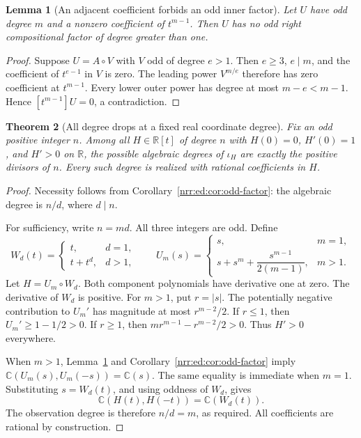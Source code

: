 \documentclass[11pt,letterpaper]{article}
\newtheorem{theorem}{Theorem}[section]
\newtheorem{lemma}[theorem]{Lemma}
\theoremstyle{definition}
\theoremstyle{remark}
\newcommand{\R}{\mathbb R}
\newcommand{\C}{\mathbb C}
\begin{document}
\begin{lemma}[An adjacent coefficient forbids an odd inner factor]
\label{nrr:ed:lem:adjacent}
Let $U$ have odd degree $m$ and a nonzero coefficient of $t^{m-1}$. Then $U$
has no odd right compositional factor of degree greater than one.
\end{lemma}

\begin{proof}
Suppose $U=A\circ V$ with $V$ odd of degree $e>1$. Then $e\ge3$, $e\mid m$,
and the coefficient of $t^{e-1}$ in $V$ is zero. The leading power
$V^{m/e}$ therefore has zero coefficient at $t^{m-1}$. Every lower outer power
has degree at most $m-e<m-1$. Hence $[t^{m-1}]U=0$, a contradiction.
\end{proof}

\begin{theorem}[All degree drops at a fixed real coordinate degree]
\label{nrr:ed:thm:divisors}
Fix an odd positive integer $n$. Among all $H\in\R[t]$ of degree $n$ with
$H(0)=0$, $H'(0)=1$, and $H'>0$ on $\R$, the possible algebraic degrees of
$\iota_H$ are exactly the positive divisors of $n$. Every such degree is
realized with rational coefficients in $H$.
\end{theorem}

\begin{proof}
Necessity follows from Corollary~\ref{nrr:ed:cor:odd-factor}: the algebraic degree is
$n/d$, where $d\mid n$.

For sufficiency, write $n=md$. All three integers are odd. Define
\[
 W_d(t)=
 \begin{cases}t,&d=1,\\ t+t^d,&d>1,\end{cases}
 \qquad
 U_m(s)=
 \begin{cases}s,&m=1,\\
 s+s^m+\dfrac{s^{m-1}}{2(m-1)},&m>1.
 \end{cases}
\]
Let $H=U_m\circ W_d$. Both component polynomials have derivative one at zero.
The derivative of $W_d$ is positive. For $m>1$, put $r=|s|$. The potentially
negative contribution to $U_m'$ has magnitude at most $r^{m-2}/2$. If $r\le1$,
then $U_m'\ge1-1/2>0$. If $r\ge1$, then
$mr^{m-1}-r^{m-2}/2>0$. Thus $H'>0$ everywhere.

When $m>1$, Lemma~\ref{nrr:ed:lem:adjacent} and Corollary~\ref{nrr:ed:cor:odd-factor} imply
$\C(U_m(s),U_m(-s))=\C(s)$. The same equality is immediate when $m=1$.
Substituting $s=W_d(t)$, and using oddness of $W_d$, gives
\[
 \C(H(t),H(-t))=\C(W_d(t)).
\]
The observation degree is therefore $n/d=m$, as required. All coefficients are
rational by construction.
\end{proof}
\end{document}
